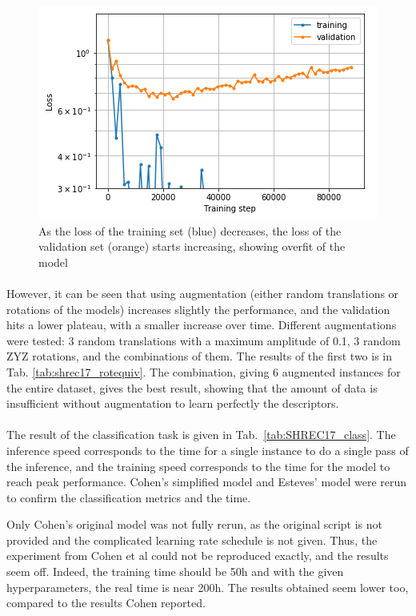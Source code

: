 \documentclass[11pt]{report}
\begin{document}
\begin{figure}[!ht]
    \centering
    \includegraphics[width=0.8\linewidth]{plot_overfit.png}
    \caption{As the loss of the training set (blue) decreases, the loss of the validation set (orange) starts increasing, showing overfit of the model}
    \label{fig:shrec17_overfit}
\end{figure}
\paragraph*{}
However, it can be seen that using augmentation (either random translations or rotations of the models) increases slightly the performance, and the validation hits a lower plateau, with a smaller increase over time. Different augmentations were tested: 3 random translations with a maximum amplitude of 0.1, 3 random ZYZ rotations, and the combinations of them. The results of the first two is in Tab. \ref{tab:shrec17_rotequiv}. The combination, giving 6 augmented instances for the entire dataset, gives the best result, showing that the amount of data is insufficient without augmentation to learn perfectly the descriptors.

\paragraph*{}
The result of the classification task is given in Tab.~\ref{tab:SHREC17_class}. The inference speed corresponds to the time for a single instance to do a single pass of the inference, and the training speed corresponds to the time for the model to reach peak performance.
Cohen's simplified model and Esteves' model were rerun to confirm the classification metrics and the time. 

Only Cohen's original model was not fully rerun, as the original script is not provided and the complicated learning rate schedule is not given. Thus, the experiment from Cohen et al could not be reproduced exactly, and the results seem off. Indeed, the training time should be 50h and with the given hyperparameters, the real time is near 200h. The results obtained seem lower too, compared to the results Cohen reported. 
\end{document}

